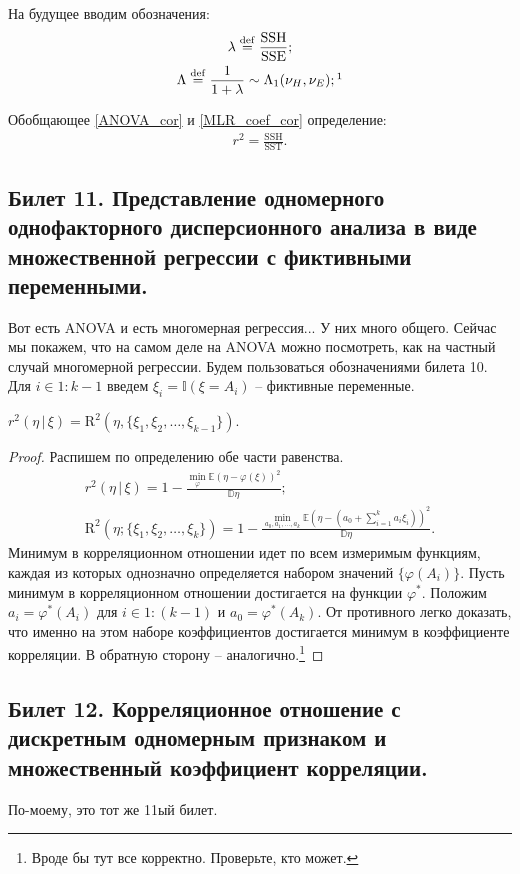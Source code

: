На будущее вводим обозначения:
\begin{gather*}
    \lambda \overset{\mathrm{def}}{=} \mathrm{\frac{SSH}{SSE}};\\
    \Lambda \overset{\mathrm{def}}{=} \frac{1}{1 + \lambda} \sim \Lambda_1 (\nu_H, \nu_E);\footnotemark
\end{gather*}

Обобщающее \eqref{ANOVA_cor} и \eqref{MLR_coef_cor} определение:
\begin{gather*}
    r^2 = \mathrm{\frac{SSH}{SST}}. 
\end{gather*}


\subsection{Билет 11. Представление одномерного однофакторного дисперсионного анализа в виде множественной регрессии с фиктивными переменными.}

Вот есть ANOVA и есть многомерная регрессия... У них много общего. Сейчас мы покажем, что на самом деле на ANOVA можно посмотреть, как на частный случай многомерной регрессии.
Будем пользоваться обозначениями билета 10.
Для $i \in 1:{k-1}$ введем $\xi_i = \mathbb I (\xi = A_i)$ -- фиктивные переменные.

\begin{thm}
    $r^2(\eta \, | \, \xi) = \mathrm R^2 (\eta, \{\xi_1, \xi_2, \ldots, \xi_{k-1}\})$.
\end{thm}
\begin{proof}
    Распишем по определению обе части равенства.
    \begin{gather*}
        r^2(\eta \, | \, \xi) = 1 - \frac{\min_{\varphi} \mathbb E(\eta - \varphi(\xi))^2}{\mathbb D \eta};\\
        \mathrm R^2(\eta; \{\xi_1, \xi_2, \ldots, \xi_k\}) = 1 - \frac{\min_{a_0, a_1, \ldots, a_k} {\mathbb E}(\eta - (a_0 + \sum_{i=1}^k a_i \xi_i))^2}{{\mathbb D} \eta}.
    \end{gather*}
    Минимум в корреляционном отношении идет по всем измеримым функциям, каждая из которых однозначно определяется набором значений $\{\varphi(A_i)\}$.
    Пусть минимум в корреляционном отношении достигается на функции $\varphi^*$. Положим $a_i = \varphi^*(A_i)$ для $i \in 1:(k-1)$ и $a_0 = \varphi^*(A_k)$.
    От противного легко доказать, что именно на этом наборе коэффициентов достигается минимум в коэффициенте корреляции.
    В обратную сторону -- аналогично.\footnote{\color{blue} Вроде бы тут все корректно. Проверьте, кто может.}
\end{proof}

\subsection{Билет 12. Корреляционное отношение с дискретным одномерным признаком и множественный коэффициент корреляции.}

По-моему, это тот же 11ый билет.
